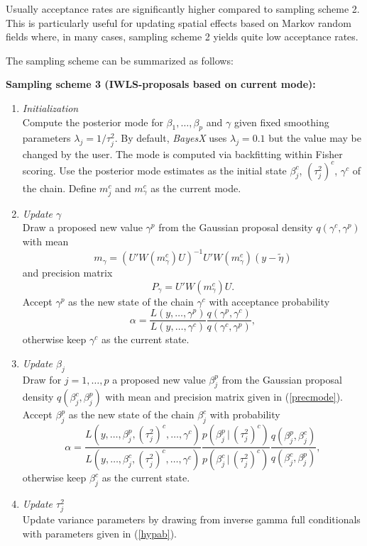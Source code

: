 \documentclass[11pt,a4paper,twoside]{bayesxarticle}
\begin{document}
Usually acceptance rates are significantly higher compared to
sampling scheme 2. This is particularly useful for updating spatial
effects based on Markov random fields where, in many cases, sampling
scheme 2 yields quite low acceptance rates.

The sampling scheme can be summarized as follows:

{\bf Sampling scheme 3 (IWLS-proposals based on current mode):}
\begin{enumerate}
\item {\em Initialization} \\
Compute the posterior mode for $\beta_1,\dots,\beta_p$ and $\gamma$
given fixed smoothing parameters $\lambda_j = 1/\tau^2_j$. By
default, {\em BayesX} uses $\lambda_j = 0.1$ but the value may be
changed by the user. The mode is computed via backfitting within
Fisher scoring. Use the posterior mode estimates as the initial
state $\beta_j^c$, $(\tau_j^2)^c$, $\gamma^c$ of the chain. Define
$m_j^c$ and $m_{\gamma}^c$ as the current mode.
\item {\em Update $\gamma$} \\
Draw a proposed new value $\gamma^p$ from the Gaussian proposal
density $q(\gamma^c,\gamma^p)$ with mean
$$
m_{\gamma} = (U' W(m_{\gamma}^c) U)^{-1}U' W(m_{\gamma}^c)
(y-\tilde{\eta} )
$$
and precision matrix
$$
P_{\gamma} = U' W(m_{\gamma}^c) U.
$$
Accept $\gamma^p$ as the new state of the chain $\gamma^c$ with
acceptance probability
$$
\alpha = \frac{ L(y,\dots,\gamma^p)} {L(y,\dots,\gamma^c)} \frac{
q(\gamma^p,\gamma^c)}{q(\gamma^c,\gamma^p)},
$$
otherwise keep $\gamma^c$ as the current state.
\item {\em Update $\beta_j$} \\
Draw for $j=1,\dots,p$ a proposed new value $\beta_j^p$ from the
Gaussian proposal density $q(\beta_j^c,\beta_j^p)$ with mean and
precision matrix given in (\ref{precmode}). Accept $\beta^p_j$ as
the new state of the chain $\beta_j^c$ with probability
$$
\alpha = \frac{
L(y,\dots,\beta^{p}_j,(\tau_j^2)^{c},\dots,\gamma^c)}
{L(y,\dots,\beta^{c}_j,(\tau_j^2)^{c},\dots,\gamma^c)}
\frac{p(\beta_j^p \, | \, (\tau_j^2)^c)}{p(\beta_j^c \, | \,
(\tau_j^2)^c)} \frac{
q(\beta_j^p,\beta_j^c)}{q(\beta_j^c,\beta_j^p)},
$$
otherwise keep $\beta_j^c$ as the current state.
\item {\em Update $\tau^2_j$} \\
Update variance parameters by drawing from inverse gamma full
conditionals with parameters given in (\ref{hypab}).
\end{enumerate}
\end{document}
